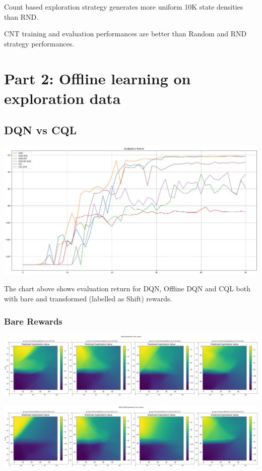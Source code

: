 \documentclass[11pt]{article}
\begin{document}
    Count based exploration strategy generates more uniform 10K state densities than RND.

    CNT training and evaluation performances are better than Random and RND strategy performances.


    \section{Part 2: Offline learning on exploration data}

    \subsection{DQN vs CQL}

    \hspace*{-0.6in}
    \includegraphics[scale=0.30]{p2/q2-p1-medium-eval-all}

    The chart above shows evaluation return for DQN, Offline DQN and CQL both with bare and transformed (labelled as Shift) rewards.

    \subsubsection{Bare Rewards}

    \hspace*{-0.4in}
    \includegraphics[scale=0.20]{p2/q2-p1-explt-dqn}

    \hspace*{-0.6in}
    \includegraphics[scale=0.20]{p2/q2-p1-explt-off-dqn}
\end{document}
